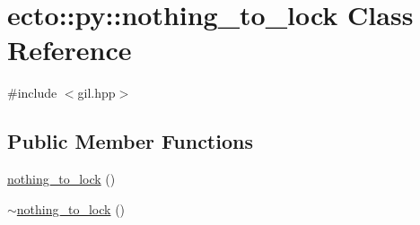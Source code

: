 \hypertarget{classecto_1_1py_1_1nothing__to__lock}{\section{ecto\-:\-:py\-:\-:nothing\-\_\-to\-\_\-lock \-Class \-Reference}
\label{classecto_1_1py_1_1nothing__to__lock}
}


{\ttfamily \#include $<$gil.\-hpp$>$}

\subsection*{\-Public \-Member \-Functions}
\begin{DoxyCompactItemize}
\item 
\hyperlink{classecto_1_1py_1_1nothing__to__lock_a277b110e856f61f30f645e4bed50c566}{nothing\-\_\-to\-\_\-lock} ()
\item 
\hyperlink{classecto_1_1py_1_1nothing__to__lock_aa734fa290aeb9aa7de729960aa12df9b}{$\sim$nothing\-\_\-to\-\_\-lock} ()
\end{DoxyCompactItemize}


